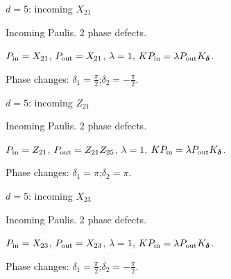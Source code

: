 \vfill
{\footnotesize\texttt{}}
\newpage
{}
{\Large $d=5$: incoming $X_{21}$}\par
Incoming Paulis. 2 phase defects.
\begin{center}
\end{center}
\vspace{-1mm}
$P_{\rm in}=X_{21}$, \quad $P_{\rm out}=X_{21}$, \quad $\lambda=1$, \qquad $K P_{\rm in}=\lambda P_{\rm out}K_{\boldsymbol\delta}$.
\par\smallskip\begin{minipage}{.98\linewidth}\small Phase changes: $\delta_{1}=\frac{\pi}{2}$;\quad $\delta_{2}=-\frac{\pi}{2}$.\end{minipage}
\vfill
{\footnotesize\texttt{}}
\newpage
{}
{\Large $d=5$: incoming $Z_{21}$}\par
Incoming Paulis. 2 phase defects.
\begin{center}
\end{center}
\vspace{-1mm}
$P_{\rm in}=Z_{21}$, \quad $P_{\rm out}=Z_{21}Z_{25}$, \quad $\lambda=1$, \qquad $K P_{\rm in}=\lambda P_{\rm out}K_{\boldsymbol\delta}$.
\par\smallskip\begin{minipage}{.98\linewidth}\small Phase changes: $\delta_{1}=\pi$;\quad $\delta_{2}=\pi$.\end{minipage}
\vfill
{\footnotesize\texttt{}}
\newpage
{}
{\Large $d=5$: incoming $X_{23}$}\par
Incoming Paulis. 2 phase defects.
\begin{center}
\end{center}
\vspace{-1mm}
$P_{\rm in}=X_{23}$, \quad $P_{\rm out}=X_{23}$, \quad $\lambda=1$, \qquad $K P_{\rm in}=\lambda P_{\rm out}K_{\boldsymbol\delta}$.
\par\smallskip\begin{minipage}{.98\linewidth}\small Phase changes: $\delta_{1}=\frac{\pi}{2}$;\quad $\delta_{2}=-\frac{\pi}{2}$.\end{minipage}
\vfill
{\footnotesize\texttt{}}
\newpage
{}
